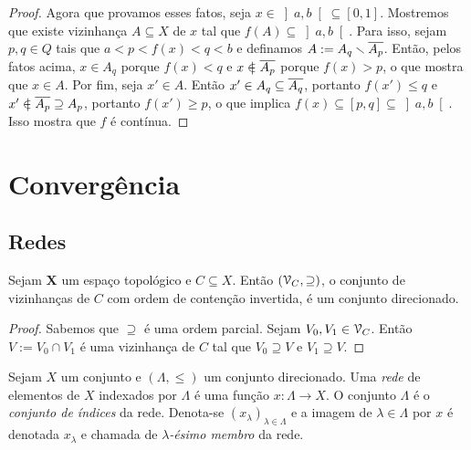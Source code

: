 \begin{proof}
Agora que provamos esses fatos, seja $x \in \left]a,b\right[ \subseteq [0,1]$. Mostremos que existe vizinhança $A \subseteq X$ de $x$ tal que $f(A) \subseteq \left]a,b\right[$. Para isso, sejam $p,q \in Q$ tais que $a<p<f(x)<q<b$ e definamos $A:=A_q \smallsetminus \overline{A_p}$. Então, pelos fatos acima, $x \in A_q$ porque $f(x)<q$ e $x \notin \Fec{A_p}$ porque $f(x)>p$, o que mostra que $x \in A$. Por fim, seja $x' \in A$. Então $x' \in A_q \subseteq \overline{A_q}$, portanto $f(x') \leq q$ e $x' \notin \Fec{A_p} \supseteq A_p$, portanto $f(x') \geq p$, o que implica $f(x) \subseteq [p,q] \subseteq \left]a,b\right[$. Isso mostra que $f$ é contínua.
\end{proof}




\section{Convergência}

\subsection{Redes}

\begin{proposition}
Sejam $\bm X$ um espaço topológico e $C \subseteq X$. Então $(\mathcal{V}_C,\supseteq)$, o conjunto de vizinhanças de $C$ com ordem de contenção invertida, é um conjunto direcionado.
\end{proposition}
\begin{proof}
Sabemos que $\supseteq$ é uma ordem parcial. Sejam $V_0,V_1 \in \mathcal{V}_C$. Então $V := V_0 \cap V_1$ é uma vizinhança de $C$ tal que $V_0 \supseteq V$ e $V_1 \supseteq V$.
\end{proof}

\begin{definition}
Sejam $X$ um conjunto e $(\Lambda,\leq)$ um conjunto direcionado. Uma \emph{rede} de elementos de $X$ indexados por $\Lambda$ é uma função $x: \Lambda \to X$. O conjunto $\Lambda$ é o \emph{conjunto de índices} da rede. Denota-se $(x_\lambda)_{\lambda \in \Lambda}$ e a imagem de $\lambda \in \Lambda$ por $x$ é denotada $x_\lambda$ e chamada de \emph{$\lambda$-ésimo membro} da rede.
\end{definition}

